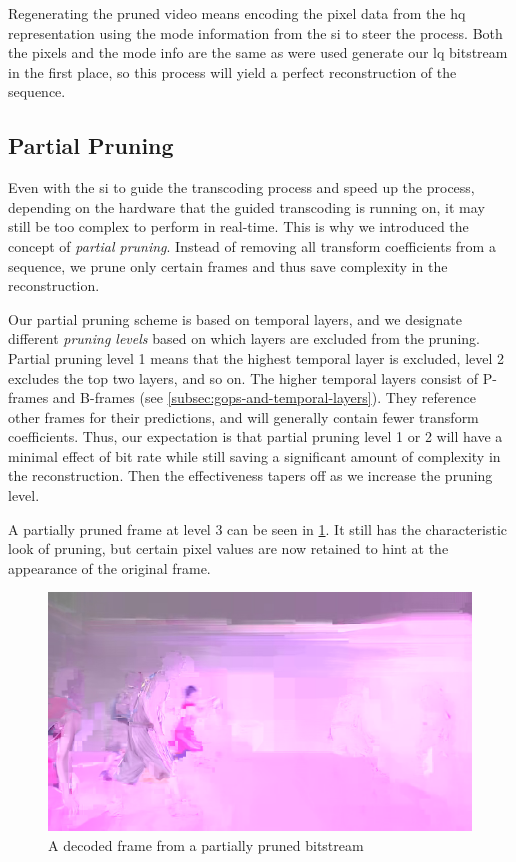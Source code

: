Regenerating the pruned video means encoding the pixel data from the \gls{hq} representation using the mode information from the \gls{si} to steer the process. Both the pixels and the mode info are the same as were used generate our \gls{lq} bitstream in the first place, so this process will yield a perfect reconstruction of the sequence.

\subsection{Partial Pruning}
\label{subsec:partial_pruning}
Even with the \gls{si} to guide the transcoding process and speed up the process, depending on the hardware that the guided transcoding is running on, it may still be too complex to perform in real-time. This is why we introduced the concept of \textit{partial pruning}. Instead of removing all transform coefficients from a sequence, we prune only certain frames and thus save complexity in the reconstruction.

Our partial pruning scheme is based on temporal layers, and we designate different \textit{pruning levels} based on which layers are excluded from the pruning. Partial pruning level 1 means that the highest temporal layer is excluded, level 2 excludes the top two layers, and so on. The higher temporal layers consist of P-frames and B-frames (see \cref{subsec:gops-and-temporal-layers}). They reference other frames for their predictions, and will generally contain fewer transform coefficients. Thus, our expectation is that partial pruning level 1 or 2 will have a minimal effect of bit rate while still saving a significant amount of complexity in the reconstruction. Then the effectiveness tapers off as we increase the pruning level.

A partially pruned frame at level 3 can be seen in \cref{fig:partially-pruned-frame}. It still has the characteristic look of pruning, but certain pixel values are now retained to hint at the appearance of the original frame.

\begin{figure}
    \centering
    \includegraphics[scale=0.5]{pictures/yuv-player-captures/basketball_drive_pp_l3_640x360_50_dec_38}
    \caption{A decoded frame from a partially pruned bitstream}
    \label{fig:partially-pruned-frame}
\end{figure}


